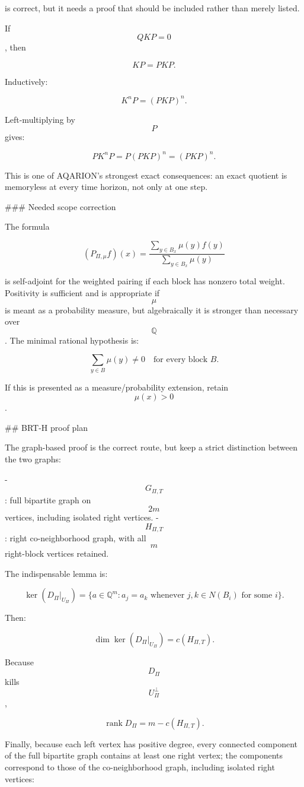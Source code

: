 is correct, but it needs a proof that should be included rather than merely listed.

If $$QKP=0$$, then

$$
KP=PKP.
$$

Inductively:

$$
K^nP=(PKP)^n.
$$

Left-multiplying by $$P$$ gives:

$$
PK^nP
=
P(PKP)^n
=
(PKP)^n.
$$

This is one of AQARION’s strongest exact consequences: an exact quotient is memoryless at every time horizon, not only at one step.

### Needed scope correction

The formula

$$
(P_{\Pi,\mu}f)(x)
=
\frac{\sum_{y\in B_x}\mu(y)f(y)}
{\sum_{y\in B_x}\mu(y)}
$$

is self-adjoint for the weighted pairing if each block has nonzero total weight. Positivity is sufficient and is appropriate if $$\mu$$ is meant as a probability measure, but algebraically it is stronger than necessary over $$\mathbb Q$$. The minimal rational hypothesis is:

$$
\sum_{y\in B}\mu(y)\ne0
\quad
\text{for every block }B.
$$

If this is presented as a measure/probability extension, retain $$\mu(x)>0$$.

## BRT-H proof plan

The graph-based proof is the correct route, but keep a strict distinction between the two graphs:

- $$G_{\Pi,T}$$: full bipartite graph on $$2m$$ vertices, including isolated right vertices.
- $$H_{\Pi,T}$$: right co-neighborhood graph, with all $$m$$ right-block vertices retained.

The indispensable lemma is:

$$
\ker(D_\Pi|_{U_\Pi})
=
\{a\in\mathbb Q^m:
a_j=a_k
\text{ whenever }j,k\in N(B_i)
\text{ for some }i\}.
$$

Then:

$$
\dim\ker(D_\Pi|_{U_\Pi})=c(H_{\Pi,T}).
$$

Because $$D_\Pi$$ kills $$U_\Pi^\perp$$,

$$
\operatorname{rank}D_\Pi
=
m-c(H_{\Pi,T}).
$$

Finally, because each left vertex has positive degree, every connected component of the full bipartite graph contains at least one right vertex; the components correspond to those of the co-neighborhood graph, including isolated right vertices:

